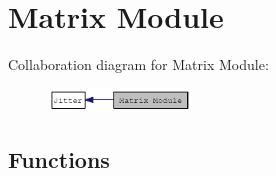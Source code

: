 \hypertarget{group__matrixmod}{
\section{Matrix Module}
\label{group__matrixmod}
}


Collaboration diagram for Matrix Module:\nopagebreak
\begin{figure}[H]
\begin{center}
\leavevmode
\includegraphics[width=107pt]{group__matrixmod}
\end{center}
\end{figure}
\subsection*{Functions}
